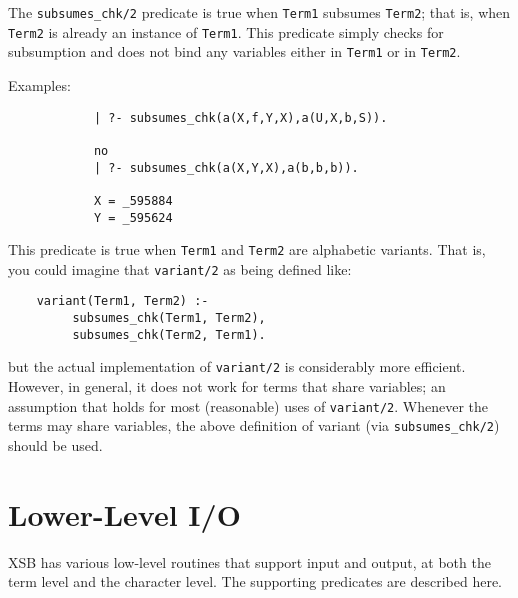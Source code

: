 \begin{description}
    The {\tt subsumes\_chk/2} predicate is true when {\tt Term1} subsumes 
    {\tt Term2}; that is, when {\tt Term2} is already an instance of
    {\tt Term1}.  This predicate simply checks for subsumption and 
    does not bind any variables either in {\tt Term1} or in {\tt Term2}.

    Examples:
    {\footnotesize
     \begin{verbatim}
            | ?- subsumes_chk(a(X,f,Y,X),a(U,X,b,S)).

            no
            | ?- subsumes_chk(a(X,Y,X),a(b,b,b)).

            X = _595884
            Y = _595624
     \end{verbatim}}

    This predicate is true when {\tt Term1} and {\tt Term2} are 
    alphabetic variants.  That is, you could imagine that {\tt variant/2}
    as being defined like:
    \begin{center}
    \begin{minipage}{3.5in}
    \begin{verbatim}
	variant(Term1, Term2) :-
	     subsumes_chk(Term1, Term2),
	     subsumes_chk(Term2, Term1).
    \end{verbatim}
    \end{minipage}
    \end{center}
    but the actual implementation of {\tt variant/2} is considerably more
    efficient.  However, in general, it does not work for terms that share
    variables; an assumption that holds for most (reasonable) uses of
    {\tt variant/2}.  Whenever the terms may share variables, the above
    definition of variant (via {\tt subsumes\_chk/2}) should be used.
\end{description}


\section{Lower-Level I/O}

XSB  has various low-level routines that support input and output, 
at both the term level and the character level.  The supporting
predicates are described here.

